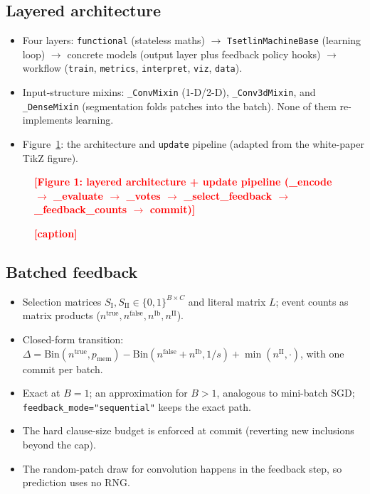 \documentclass[twoside,11pt]{article}
\newcommand{\ph}[1]{\textcolor{red}{\textbf{[#1]}}}
\newenvironment{plan}{\begin{itemize}\color{gray}\small}{\end{itemize}}
\newcommand{\code}[1]{\texttt{#1}}
\begin{document}
\subsection{Layered architecture}
\begin{plan}
  \item Four layers: \code{functional} (stateless maths) $\rightarrow$ \code{TsetlinMachineBase} (learning loop) $\rightarrow$ concrete models (output layer plus feedback policy hooks) $\rightarrow$ workflow (\code{train}, \code{metrics}, \code{interpret}, \code{viz}, \code{data}).
  \item Input-structure mixins: \code{\_ConvMixin} (1-D/2-D), \code{\_Conv3dMixin}, and \code{\_DenseMixin} (segmentation folds patches into the batch). None of them re-implements learning.
  \item Figure~\ref{fig:arch}: the architecture and \code{update} pipeline (adapted from the white-paper TikZ figure).
\end{plan}

\begin{figure}[t]
  \centering
  \ph{Figure 1: layered architecture + update pipeline (\_encode $\to$ \_evaluate $\to$ \_votes $\to$ \_select\_feedback $\to$ \_feedback\_counts $\to$ commit)}
  \caption{\ph{caption}}
  \label{fig:arch}
\end{figure}

\subsection{Batched feedback}
\begin{plan}
  \item Selection matrices $S_{\mathrm{I}}, S_{\mathrm{II}} \in \{0,1\}^{B\times C}$ and literal matrix $L$; event counts as matrix products ($n^{\text{true}}, n^{\text{false}}, n^{\text{Ib}}, n^{\text{II}}$).
  \item Closed-form transition: $\Delta = \mathrm{Bin}(n^{\text{true}}, p_{\text{mem}}) - \mathrm{Bin}(n^{\text{false}}+n^{\text{Ib}}, 1/s) + \min(n^{\text{II}}, \cdot)$, with one commit per batch.
  \item Exact at $B=1$; an approximation for $B>1$, analogous to mini-batch SGD; \code{feedback\_mode="sequential"} keeps the exact path.
  \item The hard clause-size budget is enforced at commit (reverting new inclusions beyond the cap).
  \item The random-patch draw for convolution happens in the feedback step, so prediction uses no RNG.
\end{plan}
\end{document}
